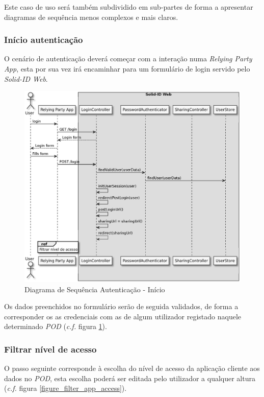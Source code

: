 Este caso de uso será também subdividido em sub-partes de forma a apresentar diagramas de sequência menos complexos e mais claros.

\subsubsection{Início autenticação}

O cenário de autenticação deverá começar com a interação numa \emph{Relying Party App}, esta por sua vez irá encaminhar para um formulário de login servido pelo \emph{Solid-ID Web}.

\begin{figure}[H]
    \begin{center}
    \includegraphics[height=0.7 \textwidth]{figures/authentication_sd_1.eps}
    \caption{Diagrama de Sequência Autenticação - Início}
        \label{autenticacao_sd1}
    \end{center}
\end{figure}

Os dados preenchidos no formulário serão de seguida validados, de forma a corresponder os as credenciais com as de algum utilizador registado naquele determinado \emph{POD} (\emph{c.f.} figura \ref{autenticacao_sd1}).

\subsubsection{Filtrar nível de acesso}
O passo seguinte corresponde à escolha do nível de acesso da aplicação cliente aos dados no \emph{\acrshort{POD}}, esta escolha poderá ser editada pelo utilizador a qualquer altura (\emph{c.f.} figura \ref{figure_filter_app_access}).


